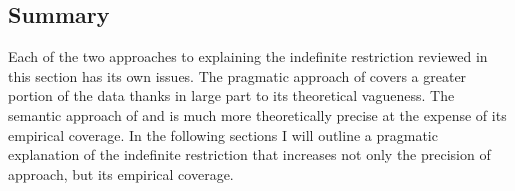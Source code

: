 \documentclass[GPFinal]{subfiles}
\begin{document}
\subsection{Summary}
Each of the two approaches to explaining the indefinite restriction reviewed in this section has its own issues.
The pragmatic approach of \textcite{mikkelsen2004specifying} covers a greater portion of the data thanks in large part to its theoretical vagueness.
The semantic approach of \textcite{heycockkroch1999pseudocleft} and \textcite{heycock2012specification} is much more theoretically precise at the expense of its empirical coverage.
In the following sections I will outline a pragmatic explanation of the indefinite restriction that increases not only the precision of  approach, but its empirical coverage.
\end{document}
